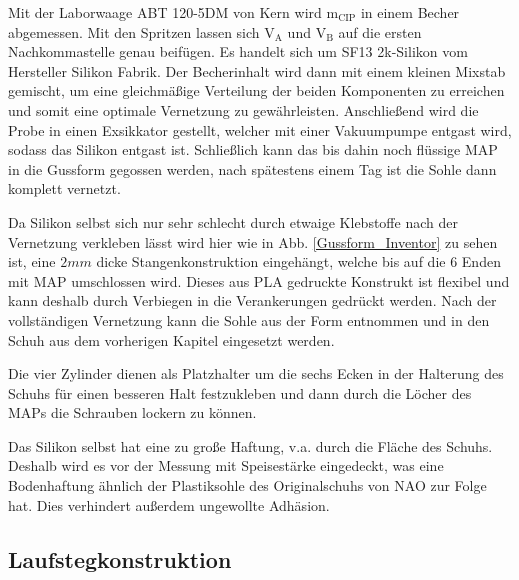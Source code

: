Mit der Laborwaage ABT 120-5DM von Kern wird $\text{m}_\text{CIP}$ in einem Becher abgemessen. Mit den Spritzen lassen sich $\text{V}_\text{A}$ und $\text{V}_\text{B}$ auf die ersten Nachkommastelle genau beifügen. Es handelt sich um SF13 2k-Silikon vom Hersteller Silikon Fabrik. Der Becherinhalt wird dann mit einem kleinen Mixstab gemischt, um eine gleichmäßige Verteilung der beiden Komponenten zu erreichen und somit eine optimale Vernetzung zu gewährleisten. Anschließend wird die Probe in einen Exsikkator gestellt, welcher mit einer Vakuumpumpe entgast wird, sodass das Silikon entgast ist. Schließlich kann das bis dahin noch flüssige MAP in die Gussform gegossen werden, nach spätestens einem Tag ist die Sohle dann komplett vernetzt. 

Da Silikon selbst sich nur sehr schlecht durch etwaige Klebstoffe nach der Vernetzung verkleben lässt wird hier wie in Abb. \ref{Gussform_Inventor} zu sehen ist, eine $2\unit{mm}$ dicke Stangenkonstruktion eingehängt, welche bis auf die 6 Enden mit MAP umschlossen wird. Dieses aus PLA gedruckte Konstrukt ist flexibel und kann deshalb durch Verbiegen in die Verankerungen gedrückt werden. Nach der vollständigen Vernetzung kann die Sohle aus der Form entnommen und in den Schuh aus dem vorherigen Kapitel eingesetzt werden. 

Die vier Zylinder dienen als Platzhalter um die sechs Ecken in der Halterung des Schuhs für einen besseren Halt festzukleben und dann durch die Löcher des MAPs die Schrauben lockern zu können. 

Das Silikon selbst hat eine zu große Haftung, v.a. durch die Fläche des Schuhs. Deshalb wird es vor der Messung mit Speisestärke eingedeckt, was eine Bodenhaftung ähnlich der Plastiksohle des Originalschuhs von NAO zur Folge hat. Dies verhindert außerdem ungewollte Adhäsion.

\subsection{Laufstegkonstruktion} \FloatBarrier

